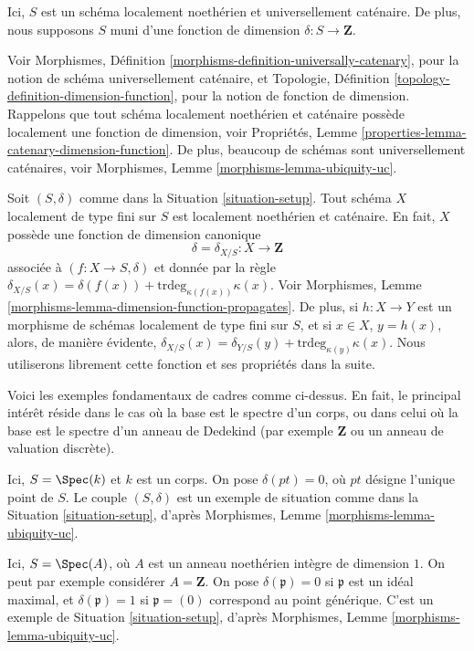 \begin{situation}
\label{situation-setup}
Ici, $S$ est un schéma localement noethérien et universellement caténaire.
De plus, nous supposons $S$ muni d'une fonction de dimension
$\delta : S \longrightarrow \mathbf{Z}$.
\end{situation}

\noindent
Voir Morphismes, Définition \ref{morphisms-definition-universally-catenary},
pour la notion de schéma universellement caténaire, et
Topologie, Définition \ref{topology-definition-dimension-function},
pour la notion de fonction de dimension. Rappelons que tout schéma localement
noethérien et caténaire possède localement une fonction de dimension, voir
Propriétés, Lemme \ref{properties-lemma-catenary-dimension-function}.
De plus, beaucoup de schémas sont universellement caténaires,
voir Morphismes, Lemme \ref{morphisms-lemma-ubiquity-uc}.

\medskip\noindent
Soit $(S, \delta)$ comme dans la Situation \ref{situation-setup}.
Tout schéma $X$ localement de type fini sur $S$ est localement noethérien
et caténaire. En fait, $X$ possède une fonction de dimension canonique
$$
\delta = \delta_{X/S} : X \longrightarrow \mathbf{Z}
$$
associée à $(f : X \to S, \delta)$ et donnée par la règle
$\delta_{X/S}(x) = \delta(f(x)) + \text{trdeg}_{\kappa(f(x))}\kappa(x)$.
Voir Morphismes, Lemme \ref{morphisms-lemma-dimension-function-propagates}.
De plus, si $h : X \to Y$ est un morphisme de schémas localement de type
fini sur $S$, et si $x \in X$, $y = h(x)$,
alors, de manière évidente,
$\delta_{X/S}(x) = \delta_{Y/S}(y) + \text{trdeg}_{\kappa(y)}\kappa(x)$.
Nous utiliserons librement cette fonction et ses propriétés dans la suite.

\medskip\noindent
Voici les exemples fondamentaux de cadres comme ci-dessus.
En fait, le principal intérêt réside dans le cas où la base
est le spectre d'un corps, ou dans celui où la base
est le spectre d'un anneau de Dedekind (par exemple $\mathbf{Z}$
ou un anneau de valuation discrète).

\begin{example}
\label{example-field}
Ici, $S = \Spec(k)$ et $k$ est un corps.
On pose $\delta(pt) = 0$, où $pt$ désigne l'unique point de $S$.
Le couple $(S, \delta)$ est un exemple de situation comme dans la
Situation \ref{situation-setup}, d'après
Morphismes, Lemme \ref{morphisms-lemma-ubiquity-uc}.
\end{example}

\begin{example}
\label{example-domain-dimension-1}
Ici, $S = \Spec(A)$, où $A$ est un anneau noethérien intègre
de dimension $1$.
On peut par exemple considérer $A = \mathbf{Z}$.
On pose $\delta(\mathfrak p) = 0$ si
$\mathfrak p$ est un idéal maximal, et $\delta(\mathfrak p) = 1$
si $\mathfrak p = (0)$ correspond au point générique.
C'est un exemple de Situation \ref{situation-setup}, d'après
Morphismes, Lemme \ref{morphisms-lemma-ubiquity-uc}.
\end{example}

